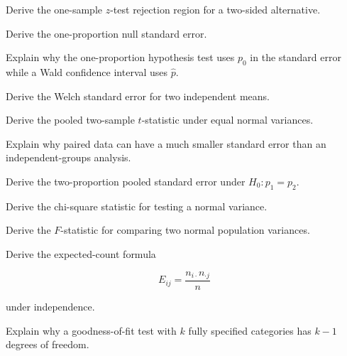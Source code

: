\begin{exercise}[3]
Derive the one-sample \(z\)-test rejection region for a two-sided
alternative.
\end{exercise}

\begin{exercise}[3]
Derive the one-proportion null standard error.
\end{exercise}

\begin{exercise}[3]
Explain why the one-proportion hypothesis test uses \(p_0\) in the
standard error while a Wald confidence interval uses \(\widehat{p}\).
\end{exercise}

\begin{exercise}[3]
Derive the Welch standard error for two independent means.
\end{exercise}

\begin{exercise}[3]
Derive the pooled two-sample \(t\)-statistic under equal normal
variances.
\end{exercise}

\begin{exercise}[3]
Explain why paired data can have a much smaller standard error than an
independent-groups analysis.
\end{exercise}

\begin{exercise}[3]
Derive the two-proportion pooled standard error under
\(H_0:p_1=p_2\).
\end{exercise}

\begin{exercise}[3]
Derive the chi-square statistic for testing a normal variance.
\end{exercise}

\begin{exercise}[3]
Derive the \(F\)-statistic for comparing two normal population
variances.
\end{exercise}

\begin{exercise}[3]
Derive the expected-count formula

\[
E_{ij}
=
\frac{
n_{i\cdot}n_{\cdot j}
}{n}
\]

under independence.
\end{exercise}

\begin{exercise}[3]
Explain why a goodness-of-fit test with \(k\) fully specified categories
has \(k-1\) degrees of freedom.
\end{exercise}

